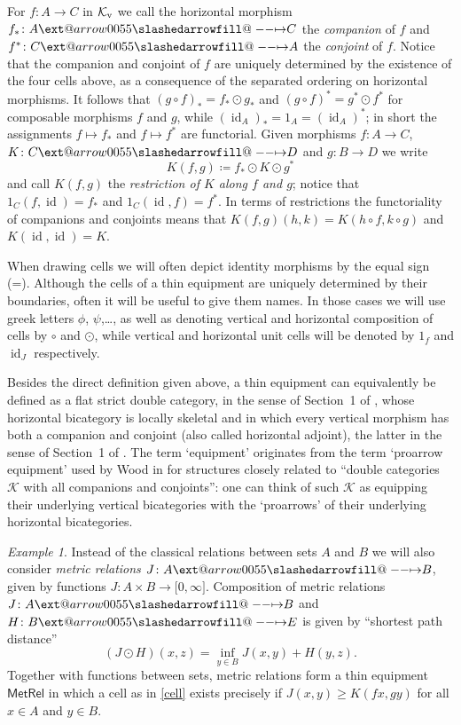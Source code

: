 \documentclass[preprint, a4paper]{elsarticle}
\makeatletter
\def\slashedarrowfill@#1#2#3#4#5{%
  $\m@th\thickmuskip0mu\medmuskip\thickmuskip\thinmuskip\thickmuskip
   \relax#5#1\mkern-7mu%
   \cleaders\hbox{$#5\mkern-2mu#2\mkern-2mu$}\hfill
   \mathclap{#3}\mathclap{#2}%
   \cleaders\hbox{$#5\mkern-2mu#2\mkern-2mu$}\hfill
   \mkern-7mu#4$%
}
\def\rightslashedarrowfill@{%
  \slashedarrowfill@\relbar\relbar\mapstochar\rightarrow}
\newcommand\xslashedrightarrow[2][]{%
  \ext@arrow 0055{\rightslashedarrowfill@}{#1}{#2}}
\def\slashedrightarrow{\xslashedrightarrow{}}
\theoremstyle{definition}
\theoremstyle{remark}
\newtheorem{example}[theorem]{Example}
\providecommand{\dfn}{\coloneqq}
\providecommand{\of}{\circ}
\providecommand{\brks}[1]{\lbrack #1 \rbrack}
\providecommand{\map}[3]{#1\colon#2\to#3}
\providecommand{\hmap}[3]{#1\colon#2\slashedrightarrow#3}
\DeclareMathOperator{\id}{id}
\providecommand{\catvar}[1]{\mathcal{#1}}
\providecommand{\2}{\mathsf 2}
\providecommand{\K}{\catvar K}
\providecommand{\MetRel}{\mathsf{MetRel}}
\providecommand{\hc}{\odot}
\makeatother
\begin{document}
  For $\map fAC$ in $\K_\textup v$ we call the horizontal morphism $\hmap{f_*}AC$ the \emph{companion} of $f$ and $\hmap{f^*}CA$ the \emph{conjoint} of $f$. Notice that the companion and conjoint of $f$ are uniquely determined by the existence of the four cells above, as a consequence of the separated ordering on horizontal morphisms. It follows that $(g \of f)_* = f_* \hc g_*$ and $(g \of f)^* = g^* \hc f^*$ for composable morphisms $f$ and $g$, while $(\id_A)_* = 1_A = (\id_A)^*$; in short the assignments $f \mapsto f_*$ and $f \mapsto f^*$ are functorial. Given morphisms $\map fAC$, $\hmap KCD$ and $\map gBD$ we write
  \begin{displaymath}
  	K(f, g) \dfn f_* \hc K \hc g^*
  \end{displaymath}
	and call $K(f, g)$ the \emph{restriction of $K$ along $f$ and $g$}; notice that $1_C(f, \id) = f_*$ and $1_C(\id, f) = f^*$. In terms of restrictions the functoriality of companions and conjoints means that $K(f, g)(h, k) = K(h \of f, k \of g)$ and $K(\id, \id) = K$.
	
  When drawing cells we will often depict identity morphisms by the equal sign (=). Although the cells of a thin equipment are uniquely determined by their boundaries, often it will be useful to give them names. In those cases we will use greek letters $\phi$, $\psi$,\dots, as well as denoting vertical and horizontal composition of cells by $\of$ and $\hc$, while vertical and horizontal unit cells will be denoted by $1_f$ and $\id_J$ respectively.
  
   Besides the direct definition given above, a thin equipment can equivalently be defined as a flat strict double category, in the sense of Section~1 of \cite{Grandis-Pare99}, whose horizontal bicategory is locally skeletal and in which every vertical morphism has both a companion and conjoint (also called horizontal adjoint), the latter in the sense of Section~1 of \cite{Grandis-Pare04}. The term `equipment' originates from the term `proarrow equipment' used by Wood in \cite{Wood82} for structures closely related to ``double categories $\K$ with all companions and conjoints'': one can think of such $\K$ as equipping their underlying vertical bicategories with the `proarrows' of their underlying horizontal bicategories.
  
	\begin{example}
		Instead of the classical relations between sets $A$ and $B$ we will also consider \emph{metric relations} $\hmap JAB$, given by functions $\map J{A \times B}{\brks{0,\infty}}$. Composition of metric relations $\hmap JAB$ and $\hmap HBE$ is given by ``shortest path distance''
		\begin{displaymath}
			(J \hc H)(x, z) = \inf_{y \in B} J(x, y) + H(y, z).
		\end{displaymath}
		Together with functions between sets, metric relations form a thin equipment $\MetRel$ in which a cell as in \eqref{cell} exists precisely if $J(x, y) \geq K(fx, gy)$ for all $x \in A$ and $y \in B$.
	\end{example}
  
\end{document}
